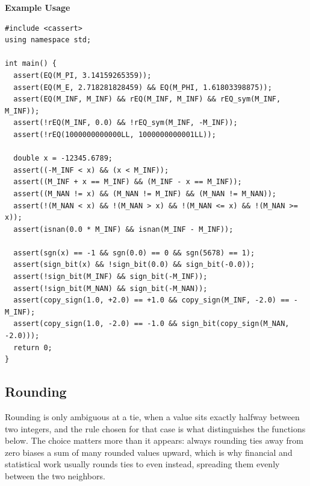 \textbf{Example Usage}\par
\begin{lstlisting}[style=cpp]
#include <cassert>
using namespace std;

int main() {
  assert(EQ(M_PI, 3.14159265359));
  assert(EQ(M_E, 2.718281828459) && EQ(M_PHI, 1.61803398875));
  assert(EQ(M_INF, M_INF) && rEQ(M_INF, M_INF) && rEQ_sym(M_INF, M_INF));
  assert(!rEQ(M_INF, 0.0) && !rEQ_sym(M_INF, -M_INF));
  assert(!rEQ(1000000000000LL, 1000000000001LL));

  double x = -12345.6789;
  assert((-M_INF < x) && (x < M_INF));
  assert((M_INF + x == M_INF) && (M_INF - x == M_INF));
  assert((M_NAN != x) && (M_NAN != M_INF) && (M_NAN != M_NAN));
  assert(!(M_NAN < x) && !(M_NAN > x) && !(M_NAN <= x) && !(M_NAN >= x));
  assert(isnan(0.0 * M_INF) && isnan(M_INF - M_INF));

  assert(sgn(x) == -1 && sgn(0.0) == 0 && sgn(5678) == 1);
  assert(sign_bit(x) && !sign_bit(0.0) && sign_bit(-0.0));
  assert(!sign_bit(M_INF) && sign_bit(-M_INF));
  assert(!sign_bit(M_NAN) && sign_bit(-M_NAN));
  assert(copy_sign(1.0, +2.0) == +1.0 && copy_sign(M_INF, -2.0) == -M_INF);
  assert(copy_sign(1.0, -2.0) == -1.0 && sign_bit(copy_sign(M_NAN, -2.0)));
  return 0;
}
\end{lstlisting}
\subsection{Rounding}
\label{sec:6.1.2}
Rounding is only ambiguous at a tie, when a value sits exactly halfway between two integers, and the rule chosen for that case is what distinguishes the functions below. The choice matters more than it appears: always rounding ties away from zero biases a sum of many rounded values upward, which is why financial and statistical work usually rounds ties to even instead, spreading them evenly between the two neighbors.

